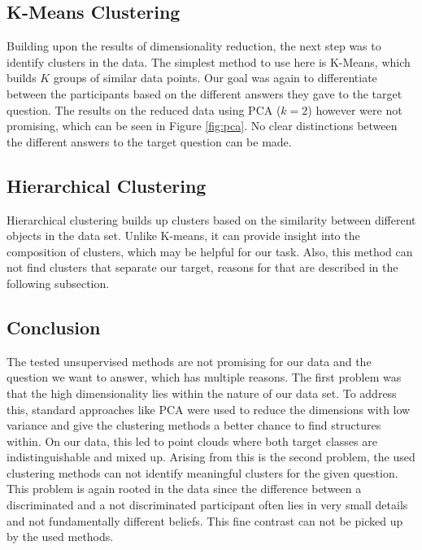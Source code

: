 \documentclass[10pt]{article}
\begin{document}
	\subsection{K-Means Clustering} %
	Building upon the results of dimensionality reduction, the next step was to identify clusters in the data. The simplest method to use here is K-Means, which builds $K$ groups of similar data points. Our goal was again to differentiate between the participants based on the different answers they gave to the target question. The results on the reduced data using PCA ($k = 2$) however were not promising, which can be seen in Figure \ref{fig:pca}. No clear distinctions between the different answers to the target question can be made.
	
	\subsection{Hierarchical Clustering} %
	Hierarchical clustering builds up clusters based on the similarity between different objects in the data set. Unlike K-means, it can provide insight into the composition of clusters, which may be helpful for our task. Also, this method can not find clusters that separate our target, reasons for that are described in the following subsection.
	

	
	\subsection{Conclusion}
	The tested unsupervised methods are not promising for our data and the question we want to answer, which has multiple reasons.
	The first problem was that the high dimensionality lies within the nature of our data set. To address this, standard approaches like PCA were used to reduce the dimensions with low variance and give the clustering methods a better chance to find structures within. On our data, this led to point clouds where both target classes are indistinguishable and mixed up.
	Arising from this is the second problem, the used clustering methods can not identify meaningful clusters for the given question. This problem is again rooted in the data since the difference between a discriminated and a not discriminated participant often lies in very small details and not fundamentally different beliefs. This fine contrast can not be picked up by the used methods.
	
\end{document}
